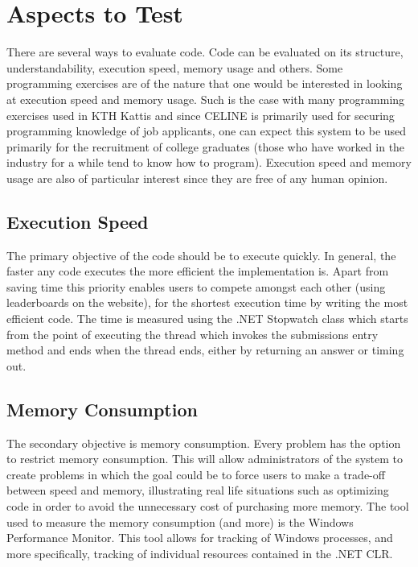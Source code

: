 \section{Aspects to Test}
There are several ways to evaluate code. Code can be evaluated on its structure, understandability, execution speed, memory usage and others. Some programming exercises are of the nature that one would be interested in looking at execution speed and memory usage. Such is the case with many programming exercises used in KTH Kattis \cite{Kattis} and since CELINE is primarily used for securing programming knowledge of job applicants, one can expect this system to be used primarily for the recruitment of college graduates (those who have worked in the industry for a while tend to know how to program). Execution speed and memory usage are also of particular interest since they are free of any human opinion.


\subsection{Execution Speed}
The primary objective of the code should be to execute quickly. In general, the faster any code executes the more efficient the implementation is. Apart from saving time this priority enables users to compete amongst each other (using leaderboards on the website), for the shortest execution time by writing the most efficient code.
The time is measured using the .NET Stopwatch class \cite{Stopwatch} which starts from the point of executing the thread which invokes the submissions entry method and ends when the thread ends, either by returning an answer or timing out.


\subsection{Memory Consumption}
The secondary objective is memory consumption. Every problem has the option to restrict memory consumption. This will allow administrators of the system to create problems in which the goal could be to force users to make a trade-off between speed and memory, illustrating real life situations such as optimizing code in order to avoid the unnecessary cost of purchasing more memory.
The tool used to measure the memory consumption (and more) is the Windows Performance Monitor. This tool allows for tracking of Windows processes, and more specifically, tracking of individual resources contained in the .NET CLR.
